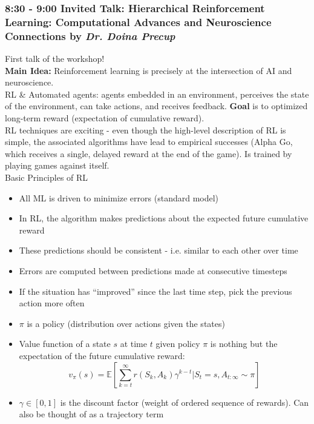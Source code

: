 \documentclass[12pt]{article}
\begin{document}
\subsubsection{8:30 - 9:00 Invited Talk: Hierarchical Reinforcement Learning: Computational Advances and Neuroscience Connections by \textit{Dr. Doina Precup}}
First talk of the workshop! \\

\textbf{Main Idea:} Reinforcement learning is precisely at the intersection of AI and neuroscience. \\

RL \& Automated agents: agents embedded in an environment, perceives the state of the environment, can take actions, and receives feedback. \textbf{Goal} is to optimized long-term reward (expectation of cumulative reward). \\

RL techniques are exciting - even though the high-level description of RL is simple, the associated algorithms have lead to empirical successes (Alpha Go, which receives a single, delayed reward at the end of the game). Is trained by playing games against itself. \\

Basic Principles of RL
\begin{itemize}
    \item All ML is driven to minimize errors (standard model)
    \item In RL, the algorithm makes predictions about the expected future cumulative reward
    \item These predictions should be consistent - i.e. similar to each other over time
    \item Errors are computed between predictions made at consecutive timesteps 
    \item If the situation has ``improved'' since the last time step, pick the previous action more often
\end{itemize}

\begin{itemize}
    \item $\pi$ is a policy (distribution over actions given the states)
    \item Value function of a state $s$ at time $t$ given policy $\pi$ is nothing but the expectation of the future cumulative reward: $$v_\pi(s) = \mathbb{E}[\sum_{k=t}^\infty r(S_k, A_k)\gamma^{k-t}| S_t=s, A_{t:\infty} \sim \pi]$$
    \item $\gamma \in [0,1]$ is the discount factor (weight of ordered sequence of rewards). Can also be thought of as a trajectory term
\end{itemize}
\end{document}
